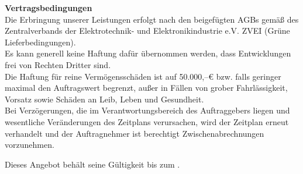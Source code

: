 {\Large\textbf{Vertragsbedingungen}}\\\newline
Die Erbringung unserer Leistungen erfolgt nach den beigefügten AGBs gemäß des Zentralverbands der Elektrotechnik- und Elektronikindustrie e.V. ZVEI (Grüne Lieferbedingungen).\\\newline
Es kann generell keine Haftung dafür übernommen werden, dass Entwicklungen frei von Rechten Dritter sind.\\\newline
Die Haftung für reine Vermögensschäden ist auf 50.000,--€ bzw. falls geringer maximal den Auftragswert begrenzt, außer in Fällen von grober Fahrlässigkeit, Vorsatz sowie Schäden an Leib, Leben und Gesundheit.\\\newline
Bei Verzögerungen, die im Verantwortungsbereich des Auftraggebers liegen und wesentliche Veränderungen des Zeitplans verursachen, wird der Zeitplan erneut verhandelt und der Auftragnehmer ist berechtigt Zwischenabrechnungen vorzunehmen.\\\newline

Dieses Angebot behält seine Gültigkeit bis zum \Ablaufdatum.
\vspace*{3\baselineskip}\\
